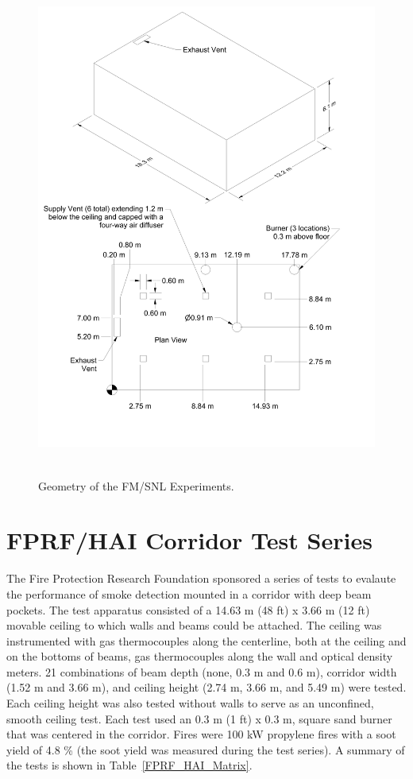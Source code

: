 \begin{figure}
\begin{center}
\includegraphics[height=6.5in]{FIGURES/FM_SNL/FM_SNL_Drawing}
\end{center}
\caption{Geometry of the FM/SNL Experiments.}
\label{FM_SNL_Drawing}
\end{figure}

\clearpage


\section{FPRF/HAI Corridor Test Series}

The Fire Protection Research Foundation sponsored a series of tests to evalaute the performance of smoke detection mounted in a corridor with deep beam pockets.  The test apparatus consisted of a 14.63 m (48 ft) x 3.66 m (12 ft) movable ceiling to which walls and beams could be attached.  The ceiling was instrumented with gas thermocouples along the centerline,  both at the ceiling and on the bottoms of beams, gas thermocouples along the wall and optical density meters.  21 combinations of beam depth (none, 0.3 m and 0.6 m), corridor width (1.52 m and 3.66 m), and ceiling height (2.74 m, 3.66 m, and 5.49 m) were tested.  Each ceiling height was also tested without walls to serve as an unconfined, smooth ceiling test.  Each test used an 0.3 m (1 ft) x 0.3 m, square sand burner that was centered in the corridor.  Fires were 100 kW propylene fires with a soot yield of 4.8 \% (the soot yield was measured during the test series).  A summary of the tests is shown in Table~\ref{FPRF_HAI_Matrix}.

